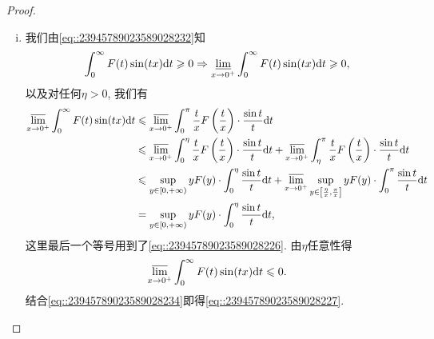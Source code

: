 \documentclass[../../main.tex]{subfiles}
\begin{document}
\begin{proof}
\begin{enumerate}[(i)]
\item 我们由\eqref{eq::23945789023589028232}知
\begin{align}
\int_0^\infty F(t)\sin(tx)\mathrm{d}t \geqslant 0 \Rightarrow \varliminf_{x \to 0^+} \int_0^\infty F(t)\sin(tx)\mathrm{d}t \geqslant 0, \label{eq::23945789023589028234}
\end{align}
以及对任何$\eta > 0$, 我们有
\begin{align*}
\varlimsup_{x \to 0^+} \int_0^\infty F(t)\sin(tx)\mathrm{d}t &\leqslant \varlimsup_{x \to 0^+} \int_0^\pi \frac{t}{x}F\left(\frac{t}{x}\right) \cdot \frac{\sin t}{t}\mathrm{d}t \\
&\leqslant \varlimsup_{x \to 0^+} \int_0^\eta \frac{t}{x}F\left(\frac{t}{x}\right) \cdot \frac{\sin t}{t}\mathrm{d}t + \varlimsup_{x \to 0^+} \int_\eta^\pi \frac{t}{x}F\left(\frac{t}{x}\right) \cdot \frac{\sin t}{t}\mathrm{d}t \\
&\leqslant \sup_{y \in [0,+\infty)} yF(y) \cdot \int_0^\eta \frac{\sin t}{t}\mathrm{d}t + \varlimsup_{x \to 0^+} \sup_{y \in \left[ \frac{\eta}{x}, \frac{\pi}{x} \right]} yF(y) \cdot \int_0^\pi \frac{\sin t}{t}\mathrm{d}t \\
&= \sup_{y \in [0,+\infty)} yF(y) \cdot \int_0^\eta \frac{\sin t}{t}\mathrm{d}t,
\end{align*}
这里最后一个等号用到了\eqref{eq::23945789023589028226}. 由$\eta$任意性得
\[
\varlimsup_{x \to 0^+} \int_0^\infty F(t)\sin(tx)\mathrm{d}t \leqslant 0.
\]
结合\eqref{eq::23945789023589028234}即得\eqref{eq::23945789023589028227}.
\end{enumerate}

\end{proof}
\end{document}
